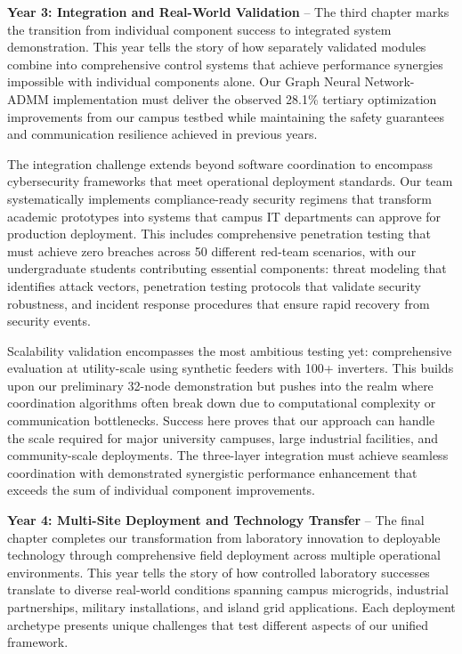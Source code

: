 \documentclass[12pt]{article}
\begin{document}
\textbf{Year 3: Integration and Real-World Validation} – The third chapter marks the transition from individual component success to integrated system demonstration. This year tells the story of how separately validated modules combine into comprehensive control systems that achieve performance synergies impossible with individual components alone. Our Graph Neural Network-ADMM implementation must deliver the observed 28.1\% tertiary optimization improvements from our campus testbed while maintaining the safety guarantees and communication resilience achieved in previous years.

The integration challenge extends beyond software coordination to encompass cybersecurity frameworks that meet operational deployment standards. Our team systematically implements compliance-ready security regimens that transform academic prototypes into systems that campus IT departments can approve for production deployment. This includes comprehensive penetration testing that must achieve zero breaches across 50 different red-team scenarios, with our undergraduate students contributing essential components: threat modeling that identifies attack vectors, penetration testing protocols that validate security robustness, and incident response procedures that ensure rapid recovery from security events.

Scalability validation encompasses the most ambitious testing yet: comprehensive evaluation at utility-scale using synthetic feeders with 100+ inverters. This builds upon our preliminary 32-node demonstration but pushes into the realm where coordination algorithms often break down due to computational complexity or communication bottlenecks. Success here proves that our approach can handle the scale required for major university campuses, large industrial facilities, and community-scale deployments. The three-layer integration must achieve seamless coordination with demonstrated synergistic performance enhancement that exceeds the sum of individual component improvements.

\textbf{Year 4: Multi-Site Deployment and Technology Transfer} – The final chapter completes our transformation from laboratory innovation to deployable technology through comprehensive field deployment across multiple operational environments. This year tells the story of how controlled laboratory successes translate to diverse real-world conditions spanning campus microgrids, industrial partnerships, military installations, and island grid applications. Each deployment archetype presents unique challenges that test different aspects of our unified framework.
\end{document}
